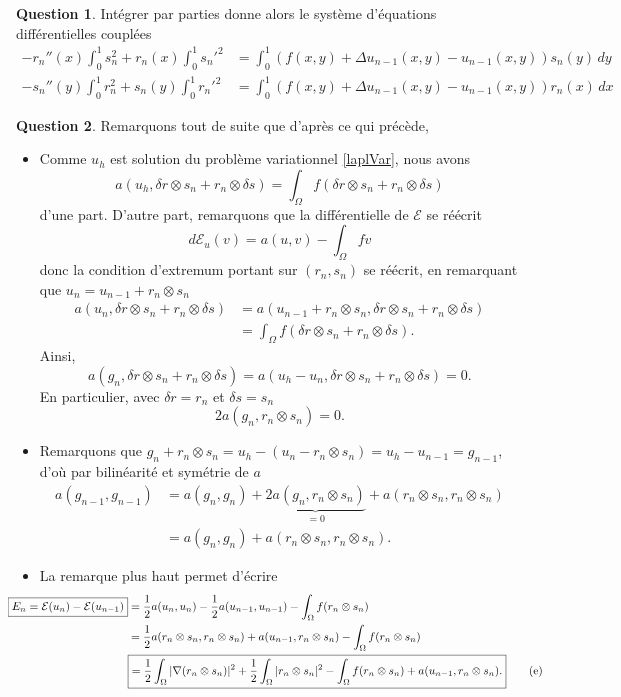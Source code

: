 \documentclass[11pt]{article}
\theoremstyle{definition}
\newtheorem{ques}{Question}
\begin{document}
\begin{ques}
Intégrer par parties donne alors le système d'équations différentielles couplées
\begin{align*}
-r_n''(x)\int_0^1 s_n^2 + r_n(x)\int_{0}^{1}{s_n'}^2 &= \int_{0}^{1}(f(x,y)+\Delta u_{n-1}(x,y) - u_{n-1}(x,y))s_n(y)\,dy \\
-s_n''(y)\int_0^1 r_n^2 + s_n(y)\int_{0}^{1}{r_n'}^2 &= \int_{0}^{1}(f(x,y)+\Delta u_{n-1}(x,y) - u_{n-1}(x,y))r_n(x)\,dx
\end{align*}


\end{ques}


\begin{ques}
Remarquons tout de suite que d'après ce qui précède, 

\begin{itemize}
\item Comme $u_h$ est solution du problème variationnel \eqref{laplVar}, nous avons
\[
a(u_h,\delta r\otimes s_n + r_n\otimes \delta s) = \int_\Omega f(\delta r\otimes s_n + r_n\otimes \delta s)
\]
d'une part. D'autre part, remarquons que la différentielle de $\mathcal{E}$ se réécrit
\[
d\mathcal{E}_u(v) = a(u,v) - \int_\Omega fv
\]
donc la condition d'extremum portant sur $(r_n,s_n)$ se réécrit, en remarquant que $u_n = u_{n-1} + r_n\otimes s_n$
\begin{align*}
a(u_n,\delta r\otimes s_n + r_n\otimes\delta s) &=
a(u_{n-1}+r_n\otimes s_n, \delta r\otimes s_n + r_n\otimes\delta s) \\
&= \int_\Omega f(\delta r\otimes s_n + r_n\otimes\delta s).
\end{align*}
Ainsi,
\[
\boxed{a(g_n,\delta r\otimes s_n + r_n\otimes\delta s) = a(u_h-u_n,\delta r\otimes s_n + r_n\otimes\delta s) = 0.}
\]
En particulier, avec $\delta r = r_n$ et $\delta s= s_n$
\[
2a(g_n,r_n\otimes s_n) = 0.
\]

\item Remarquons que $g_n + r_n\otimes s_n = u_h - (u_n - r_n\otimes s_n) = u_h - u_{n-1} = g_{n-1}$, d'où par bilinéarité et symétrie de $a$
\begin{align*}
\boxed{a(g_{n-1},g_{n-1})} 
&= a(g_n,g_n) + \underbrace{2a(g_n,r_n\otimes s_n)}_{=0} + a(r_n\otimes s_n,r_n\otimes s_n) \\
&\boxed{= a(g_n,g_n) + a(r_n\otimes s_n,r_n\otimes s_n).}
\end{align*}

\item La remarque plus haut permet d'écrire
\begin{align*}\hspace*{-1cm}
\boxed{E_n = \mathcal{E}(u_n) - \mathcal{E}(u_{n-1})}
&= \frac 12a(u_n,u_n) - \frac 12 a(u_{n-1},u_{n-1}) - \int_\Omega f(r_n\otimes s_n) \\
&= \frac 12 a(r_n\otimes s_n,r_n\otimes s_n) + a(u_{n-1},r_n\otimes s_n) - \int_\Omega f(r_n\otimes s_n) \\
&\boxed{= \frac 12\int_\Omega |\nabla(r_n\otimes s_n)|^2 + \frac 12\int_\Omega |r_n\otimes s_n|^2 - \int_\Omega f(r_n\otimes s_n) + a(u_{n-1},r_n\otimes s_n).}\tag{e}\label{eq:e}
\end{align*}


\end{itemize}
\end{ques}
\end{document}
